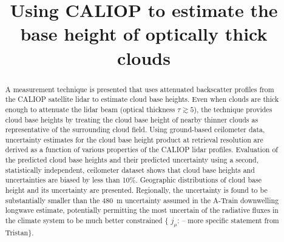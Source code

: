\documentclass[essd,manuscript]{copernicus}\usepackage[]{graphicx}\usepackage[]{color}
\newcommand{\hlnum}[1]{\textcolor[rgb]{0.686,0.059,0.569}{#1}}%
\newcommand\comment[2]{\{\hlnum{ \textit{#1}: #2}\}}
\newcommand\commentjm[1]{\comment{$j_\mu$}{#1}}
\begin{document}

\title{Using CALIOP to estimate the base height of optically thick clouds}













\received{}
\pubdiscuss{} %
\revised{}
\accepted{}
\published{}




\maketitle



\begin{abstract}
  A measurement technique is presented that uses attenuated backscatter profiles
  from the CALIOP satellite lidar to estimate cloud base heights.  Even when
  clouds are thick enough to attenuate the lidar beam (optical thickness
  $\tau \gtrsim 5$), the technique provides cloud base heights by treating the
  cloud base height of nearby thinner clouds as representative of the
  surrounding cloud field.  Using ground-based ceilometer data, uncertainty
  estimates for the cloud base height product at retrieval resolution are
  derived as a function of various properties of the CALIOP lidar profiles.
  Evaluation of the predicted cloud base heights and their predicted uncertainty
  using a second, statistically independent, ceilometer dataset shows that cloud
  base heights and uncertainties are biased by less than 10\%.  Geographic
  distributions of cloud base height and its uncertainty are presented.
  Regionally, the uncertainty is found to be substantially smaller than the
  480~m uncertainty assumed in the A-Train downwelling longwave estimate,
  potentially permitting the most uncertain of the radiative fluxes in the
  climate system to be much better constrained \commentjm{-- more specific
    statement from Tristan}.
\end{abstract}
\end{document}
